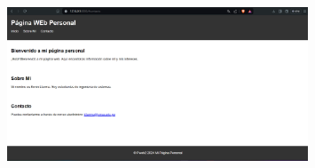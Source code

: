 \documentclass{article}
\begin{document}
    \begin{figure}[H]
		          \centering
		          \includegraphics[width=0.8\textwidth,keepaspectratio]                       {img/pagina_corriendo.png}
    \end{figure}
\end{document}

